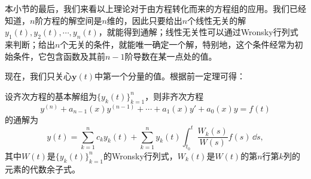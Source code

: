 本小节的最后，我们来看以上理论对于由方程转化而来的方程组的应用。我们已经知道，$n$阶方程的解空间是$n$维的，因此只要给出$n$个线性无关的解$y_1(t),y_2(t),\cdots,y_n(t)$，就能得到通解；线性无关性可以通过Wronsky行列式来判断；给出$n$个无关的条件，就能唯一确定一个解，特别地，这个条件经常为初始条件，它包含函数及其前$n-1$阶导数在某一点处的值。

现在，我们只关心$\mathbf{y}(t)$中第一个分量的值。根据前一定理可得：
\begin{theorem}
    设齐次方程的基本解组为$\{y_k(t)\}_{k=1}^n$，则非齐次方程
    \begin{equation}
        y^{(n)}+a_{n-1}(x)y^{(n-1)}+\cdots+a_1(x)y'+a_0(x)y=f(t)
    \end{equation}
    的通解为
    \begin{equation}
        y(t)=\sum_{k=1}^n c_k y_k(t)+\sum_{k=1}^n y_k(t)\int_{t_0}^t \frac{W_k(s)}{W(s)}f(s)\,\dd s,
    \end{equation}
    其中$W(t)$是$\{y_k(t)\}_{k=1}^n$的Wronsky行列式，$W_k(t)$是$W(t)$的第$n$行第$k$列的元素的代数余子式。
\end{theorem}
